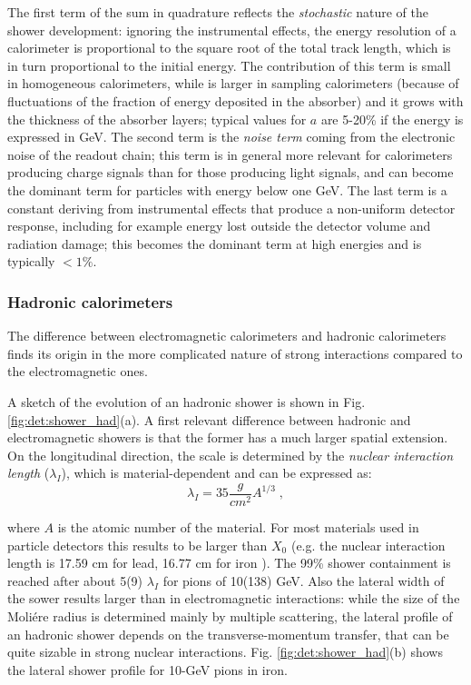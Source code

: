The first term of the sum in quadrature reflects the \textit{stochastic} nature of the shower development: ignoring the instrumental effects, the energy resolution of a calorimeter is proportional to the square root of the total track length, which is in turn proportional to the initial energy. The contribution of this term is small in homogeneous calorimeters, while is larger in sampling calorimeters (because of fluctuations of the fraction of energy deposited in the absorber) and it grows with the thickness of the absorber layers; typical values for $a$ are 5-20\% if the energy is expressed in GeV. The second term is the \textit{noise term} coming from the electronic noise of the readout chain; this term is in general more relevant for calorimeters producing charge signals than for those producing light signals, and can become the dominant term for particles with energy below one GeV. The last term is a constant deriving from instrumental effects that produce a non-uniform detector response, including for example energy lost outside the detector volume and radiation damage; this becomes the dominant term at high energies and is typically $<1\%$. 



\subsubsection*{Hadronic calorimeters}

The difference between electromagnetic calorimeters and hadronic calorimeters finds its origin in the more complicated nature of strong interactions compared to the electromagnetic ones. 

A sketch of the evolution of an hadronic shower is shown in Fig. \ref{fig:det:shower_had}(a). A first relevant difference between hadronic and electromagnetic showers is that the former has a much larger spatial extension. On the longitudinal direction, the scale is determined by the \textit{nuclear interaction length} ($\lambda_I$), which is material-dependent and can be expressed as:
\begin{equation}
\lambda_I = 35 \frac{g}{cm^2} A^{1/3} \; ,
\end{equation}

where $A$ is the atomic number of the material. For most materials used in particle detectors this results to be larger than $X_0$ (e.g. the nuclear interaction length is 17.59 cm for lead, 16.77 cm for iron \cite{Patrignani:2016xqp}). The 99\% shower containment is reached after about 5(9) $\lambda_I$ for pions of 10(138) GeV. Also the lateral width of the sower results larger than in electromagnetic interactions: while the size of the Moli\'ere radius is determined mainly by multiple scattering, the lateral profile of an hadronic shower depends on the transverse-momentum transfer, that can be quite sizable in strong nuclear interactions. Fig. \ref{fig:det:shower_had}(b) shows the lateral shower profile for 10-GeV pions in iron.

